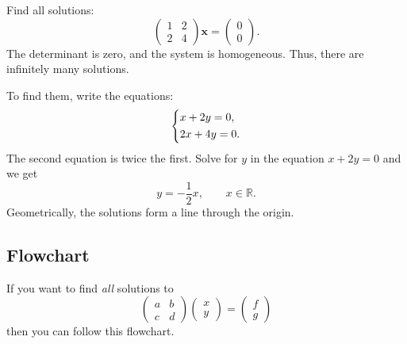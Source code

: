 \documentclass[10pt,letterpaper]{article}
\begin{document}
\begin{example}[10]{
Find all solutions:
\[
\begin{pmatrix}
1&2\\
2&4
\end{pmatrix}
\mathbf{x}
=
\begin{pmatrix}0\\0\end{pmatrix}.
\]
}
The determinant is zero, and the system is homogeneous.
Thus, there are infinitely many solutions.

To find them, write the equations:
\[
\begin{dcases}
x+2y=0,\\
2x+4y=0.
\end{dcases}
\]
The second equation is twice the first.
Solve for $y$ in the equation $x+2y=0$ and we get
\[
\boxed{
y=-\frac{1}{2}x,
\qquad x\in\mathbb R.
}
\]
Geometrically, the solutions form a line through
the origin.
\end{example}

\subsection{Flowchart}

If you want to find \textit{all} solutions to 
$$
    \begin{pmatrix}
        a & b\\c & d
    \end{pmatrix}\begin{pmatrix}
        x\\y
    \end{pmatrix} = \begin{pmatrix}
        f \\g
    \end{pmatrix}
$$
then you can follow this flowchart. 
\end{document}

